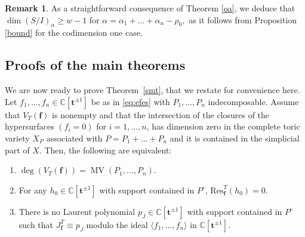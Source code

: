 \documentclass[a4paper,11pt]{amsart}
\newcommand{\MV}{\operatorname{MV}}
\newcommand{\C}{\mathbb{C}}
\newcommand{\bff}{{\boldsymbol{f}}}
\newcommand{\bft}{{\boldsymbol{t}}}
\newcounter{thm}
\numberwithin{thm}{section}
\numberwithin{equation}{section}
\theoremstyle{definition}
\newtheorem{remark}[thm]{Remark}
\theoremstyle{plain}
\begin{document}
\begin{remark}
As a straightforward consequence of Theorem \ref{oa}, we deduce that $\dim(S/I)_\alpha\geq w-1$
 for  $\alpha=\alpha_1+\ldots+\alpha_n-\rho_0,$ as it follows from
Proposition \ref{bound} for the codimension one case.
\end{remark}



\subsection{Proofs of the main theorems}



We are now ready to prove Theorem~\ref{smt}, that we restate for convenience here. Let $f_1,\ldots, f_n\in\C[\bft^{\pm1}]$ be as in \eqref{eq:efes} with  $P_1,\ldots, P_n$ indecomposable. Assume that $V_T(\bff)$ is nonempty and that the intersection of the closures of the hypersurfaces $(f_i=0)$ for $i=1,\dots,n$, has dimension zero in  the complete toric variety $X_P$ associated with $P=P_1+\dots +P_n$ and it is contained in the simplicial part of $X$.
Then, the following are equivalent:
\begin{enumerate}
\item[i)] $\deg(V_T(\bff))=\MV(P_1,\ldots, P_n)$.
\item[ii)] For any $ h_0\in\C[\bft^{\pm1}]$ with support contained in $P^\circ$, 
$\mbox{Res}^T_{\bff}(h_0) =0$.
\item[iii)] There is no Laurent polynomial  $p_J\in  \C[\bft^{\pm1}]$ with support contained in $P^\circ$ such that $J^T_\bff\equiv p_J$ modulo the ideal 
$\langle f_1,\ldots, f_n\rangle$ in $\C[\bft^{\pm1}]$. 
\end{enumerate}
\end{document}
